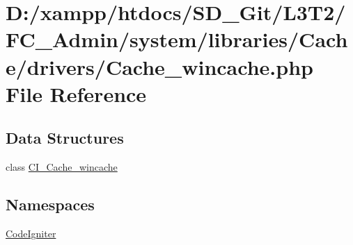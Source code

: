 \hypertarget{_admin_2system_2libraries_2_cache_2drivers_2_cache__wincache_8php}{}\section{D\+:/xampp/htdocs/\+S\+D\+\_\+\+Git/\+L3\+T2/\+F\+C\+\_\+\+Admin/system/libraries/\+Cache/drivers/\+Cache\+\_\+wincache.php File Reference}
\label{_admin_2system_2libraries_2_cache_2drivers_2_cache__wincache_8php}
\subsection*{Data Structures}
\begin{DoxyCompactItemize}
\item 
class \hyperlink{class_c_i___cache__wincache}{C\+I\+\_\+\+Cache\+\_\+wincache}
\end{DoxyCompactItemize}
\subsection*{Namespaces}
\begin{DoxyCompactItemize}
\item 
 \hyperlink{namespace_code_igniter}{Code\+Igniter}
\end{DoxyCompactItemize}
